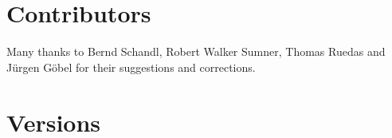 \documentclass[10pt]{article}
\begin{document}
\nodir{*}



\section{Contributors}

Many thanks to Bernd Schandl, Robert Walker Sumner, Thomas Ruedas and
J\"urgen G\"obel for their suggestions and corrections.

\section{Versions}
\end{document}
